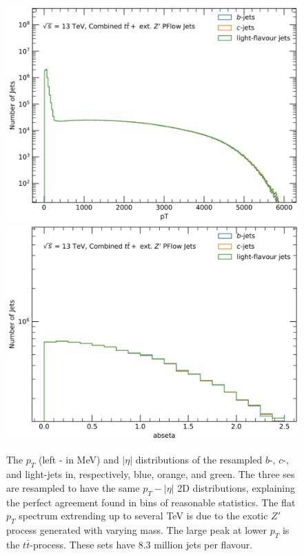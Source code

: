 \begin{figure}[h!]
  \center
  \includegraphics[scale=0.33]{Images/FTAG/DL1d/ptdist.png}
  \includegraphics[scale=0.33]{Images/FTAG/DL1d/etadist.png}
  \caption{The $p_T$ (left - in MeV) and $|\eta|$ distributions of the resampled $b$-, $c$-, and light-jets in, respectively, blue, orange, and green. The three ses are resampled to have the same $p_T-|\eta|$ 2D distributions, explaining the perfect agreement found in bins of reasonable statistics. The flat $p_T$ spectrum extrending up to several TeV is due to the exotic $Z'$ process generated with varying mass. The large peak at lower $p_T$ is the $t\bar{t}$-process. These sets have 8.3 million jets per flavour.} 
  \label{fig:distTraining}
\end{figure}

